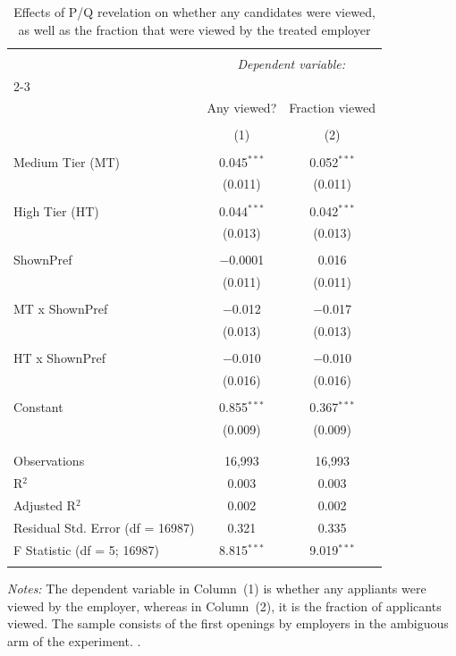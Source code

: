 
\begin{table}[!htbp] \centering 
  \caption{Effects of P/Q revelation on whether any candidates were viewed, as well as the fraction that were viewed by the treated employer} 
  \label{tab:viewed} 
\begin{tabular}{@{\extracolsep{5pt}}lcc} 
\\[-1.8ex]\hline 
\hline \\[-1.8ex] 
 & \multicolumn{2}{c}{\textit{Dependent variable:}} \\ 
\cline{2-3} 
\\[-1.8ex] & Any viewed? & Fraction viewed \\ 
\\[-1.8ex] & (1) & (2)\\ 
\hline \\[-1.8ex] 
 Medium Tier (MT) & 0.045$^{***}$ & 0.052$^{***}$ \\ 
  & (0.011) & (0.011) \\ 
  & & \\ 
 High Tier (HT) & 0.044$^{***}$ & 0.042$^{***}$ \\ 
  & (0.013) & (0.013) \\ 
  & & \\ 
 ShownPref & $-$0.0001 & 0.016 \\ 
  & (0.011) & (0.011) \\ 
  & & \\ 
 MT x ShownPref & $-$0.012 & $-$0.017 \\ 
  & (0.013) & (0.013) \\ 
  & & \\ 
 HT x ShownPref & $-$0.010 & $-$0.010 \\ 
  & (0.016) & (0.016) \\ 
  & & \\ 
 Constant & 0.855$^{***}$ & 0.367$^{***}$ \\ 
  & (0.009) & (0.009) \\ 
  & & \\ 
\hline \\[-1.8ex] 
Observations & 16,993 & 16,993 \\ 
R$^{2}$ & 0.003 & 0.003 \\ 
Adjusted R$^{2}$ & 0.002 & 0.002 \\ 
Residual Std. Error (df = 16987) & 0.321 & 0.335 \\ 
F Statistic (df = 5; 16987) & 8.815$^{***}$ & 9.019$^{***}$ \\ 
\hline 
\hline \\[-1.8ex] 
\end{tabular}
\begin{minipage}{0.9\textwidth} 
 \emph{Notes:} The dependent variable in Column~(1) is whether any appliants were viewed by the employer, whereas in Column~(2), it is the fraction of applicants viewed. The sample consists of the first openings by employers in the ambiguous arm of the experiment. \starlanguage.
 \end{minipage}
\end{table}

